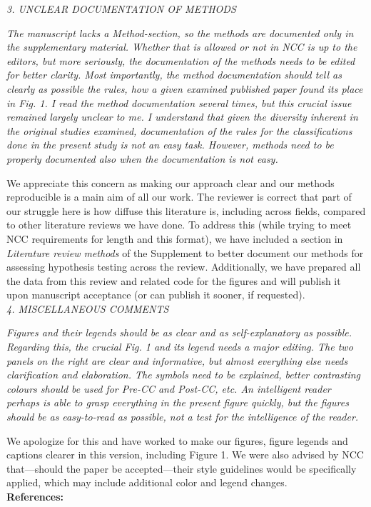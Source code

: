 \documentclass[11pt]{article}
\begin{document}
\emph{3. UNCLEAR DOCUMENTATION OF METHODS}

\emph{The manuscript lacks a Method-section, so the methods are documented only in the supplementary material. Whether that is allowed or not in NCC is up to the editors, but more seriously, the documentation of the methods needs to be edited for better clarity. Most importantly, the method documentation should tell as clearly as possible the rules, how a given examined published paper found its place in Fig. 1. I read the method documentation several times, but this crucial issue remained largely unclear to me. I understand that given the diversity inherent in the original studies examined, documentation of the rules for the classifications done in the present study is not an easy task. However, methods need to be properly documented also when the documentation is not easy.}

We appreciate this concern as making our approach clear and our methods reproducible is a main aim of all our work. The reviewer is correct that part of our struggle here is how diffuse this literature is, including across fields, compared to other literature reviews we have done. To address this (while trying to meet NCC requirements for length and this format), we have included a section in \emph{Literature review methods} of the Supplement to better document our methods for assessing hypothesis testing across the review. Additionally, we have prepared all the data from this review and related code for the figures and will publish it upon manuscript acceptance (or can publish it sooner, if requested). \\

\emph{4. MISCELLANEOUS COMMENTS}

\emph{Figures and their legends should be as clear and as self-explanatory as possible. Regarding this, the crucial Fig. 1 and its legend needs a major editing. The two panels on the right are clear and informative, but almost everything else needs clarification and elaboration. The symbols need to be explained, better contrasting colours should be used for Pre-CC and Post-CC, etc. An intelligent reader perhaps is able to grasp everything in the present figure quickly, but the figures should be as easy-to-read as possible, not a test for the intelligence of the reader.}

We apologize for this and have worked to make our figures, figure legends and captions clearer in this version, including Figure 1. We were also advised by NCC that---should the paper be accepted---their style guidelines would be specifically applied, which may include additional color and legend changes. \\

\newpage
{\bf References:}

\end{document}
